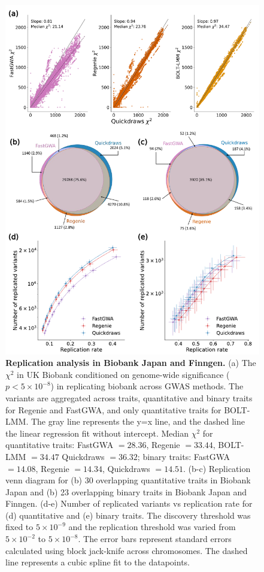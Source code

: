 \begin{figure}[h!]
    \centering
    \includegraphics[scale=0.7]{figures/qd_panel_replication.pdf}
    \caption{\textbf{Replication analysis in Biobank Japan and Finngen.} (a) The $\chi^2$ in UK Biobank conditioned on genome-wide significance ($p < 5 \times 10^{-8}$) in replicating biobank across GWAS methods. The variants are aggregated across traits, quantitative and binary traits for Regenie and FastGWA, and only quantitative traits for BOLT-LMM. The gray line represents the y=x line, and the dashed line the linear regression fit without intercept. Median $\chi^2$ for quantitative traits: FastGWA $= 28.36$, Regenie $= 33.44$, BOLT-LMM $= 34.47$ Quickdraws $= 36.32$; binary traits: FastGWA $= 14.08$, Regenie $= 14.34$, Quickdraws $= 14.51$. (b-c) Replication venn diagram for (b) 30 overlapping quantitative traits in Biobank Japan and (b) 23 overlapping binary traits in Biobank Japan and Finngen. (d-e) Number of replicated variants vs replication rate for (d) quantitative and (e) binary traits. The discovery threshold was fixed to $5 \times 10^{-9}$ and the replication threshold was varied from $5 \times 10^{-2}$ to $5 \times 10^{-8}$. The error bars represent standard errors calculated using block jack-knife across chromosomes. The dashed line represents a cubic spline fit to the datapoints.}
    \label{fig:ukb_repl}
\end{figure}



